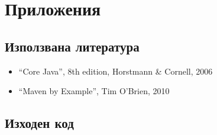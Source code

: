 \appendix
\chapter{Приложения}
\section{Използвана литература}
\begin{itemize}
  \item "`Core Java"', 8th edition, Horstmann \& Cornell, 2006
  \item "`Maven by Example"', Tim O'Brien, 2010
\end{itemize}
\section{Изходен код}
